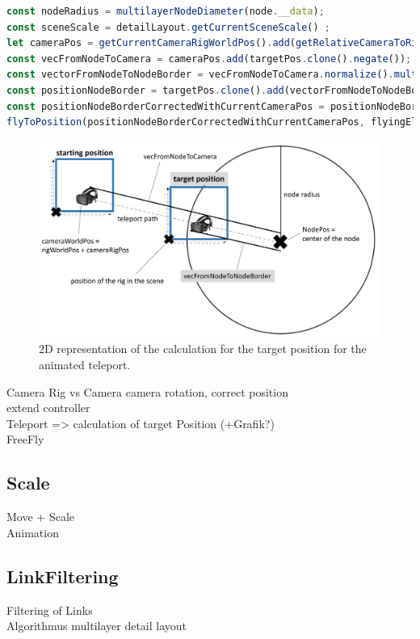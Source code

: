 \begin{lstlisting}[language=JavaScript,label={lst:calculationFlyToNode},caption=Matrix calculations for determining the target position of the animated teleport.]
const nodeRadius = multilayerNodeDiameter(node.__data);
const sceneScale = detailLayout.getCurrentSceneScale() ;
let cameraPos = getCurrentCameraRigWorldPos().add(getRelativeCameraToRigPos());
const vecFromNodeToCamera = cameraPos.add(targetPos.clone().negate());
const vectorFromNodeToNodeBorder = vecFromNodeToCamera.normalize().multiplyScalar(nodeRadius*0.95*sceneScale);//*0.95 as we want to be slightly inside the selected node
const positionNodeBorder = targetPos.clone().add(vectorFromNodeToNodeBorder);
const positionNodeBorderCorrectedWithCurrentCameraPos = positionNodeBorder.clone().add(getRelativeCameraToRigPos().negate());
flyToPosition(positionNodeBorderCorrectedWithCurrentCameraPos, flyingElement);
\end{lstlisting}
\begin{figure}[h]
    \centering
    \includegraphics[width=1\textwidth]{graphics/flyToNodePositionCalc.jpg}
    \caption{2D representation of the calculation for the target position for the animated teleport.} 
    \label{fig:vrFlyToNode} 
\end{figure}

Camera Rig vs Camera
camera rotation, correct position 
\\
extend controller
\\
Teleport => calculation of target Position (+Grafik?)
\\
FreeFly

\subsection{Scale}
\label{sec:scaling}

Move + Scale\\
Animation
\\

\subsection{LinkFiltering}
\label{sec:linkFiltering}

Filtering of Links\\
Algorithmus multilayer detail layout\\
